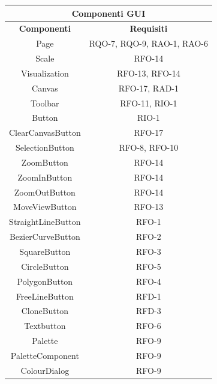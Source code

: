 

\begin{table}[h]
\begin{center}
     \begin{tabular}
           {@{\extracolsep{\fill}}|c|c|}
     \hline
     \multicolumn{2}{|c|}{ \textbf{Componenti GUI} } \\
     \hline
      \textbf{Componenti} & \textbf{Requisiti} \\
      \hline
     Page & RQO-7, RQO-9, RAO-1, RAO-6\\
     \hline
     Scale & RFO-14\\
     \hline
     Visualization & RFO-13, RFO-14 \\
     \hline   
     Canvas & RFO-17, RAD-1 \\
     \hline  
     Toolbar & RFO-11, RIO-1 \\
     \hline        
     Button & RIO-1\\
     \hline
     ClearCanvasButton & RFO-17\\
     \hline     
     SelectionButton & RFO-8, RFO-10\\
     \hline     
     ZoomButton & RFO-14\\
     \hline       
     ZoomInButton & RFO-14\\
     \hline    
     ZoomOutButton & RFO-14\\
     \hline 
     MoveViewButton & RFO-13\\
     \hline
     StraightLineButton & RFO-1\\
     \hline
 	 BezierCurveButton & RFO-2\\
 	 \hline
 	 SquareButton & RFO-3\\
 	 \hline
 	 CircleButton & RFO-5\\
 	 \hline 
 	 PolygonButton & RFO-4\\
 	 \hline
 	 FreeLineButton & RFD-1\\
 	 \hline
 	 CloneButton & RFD-3\\
 	 \hline
 	 Textbutton & RFO-6\\
 	 \hline
     Palette & RFO-9 \\
     \hline
     PaletteComponent & RFO-9\\
     \hline
     ColourDialog & RFO-9\\

\end{tabular}
\end{center}
\end{table}
